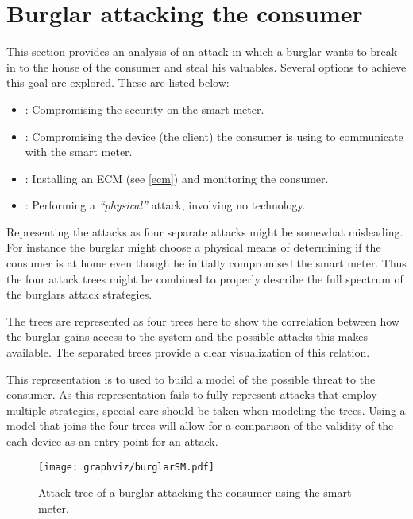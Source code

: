\section{Burglar attacking the consumer}
This section provides an analysis of an attack in which a burglar wants to break in to the house of the consumer and steal his valuables.
Several options to achieve this goal are explored.
These are listed below:
\begin{itemize}
  \item {}: Compromising the security on the smart meter.
  \item {}: Compromising the device (the client) the consumer is using to communicate with the smart meter.
  \item {}: Installing an ECM (see \cref{ecm}) and monitoring the consumer.
  \item {}: Performing a \emph{``physical''} attack, involving no technology.
\end{itemize}

Representing the attacks as four separate attacks might be somewhat misleading.
For instance the burglar might choose a physical means of determining if the consumer is at home even though he initially compromised the smart meter.
Thus the four attack trees might be combined to properly describe the full spectrum of the burglars attack strategies.

The trees are represented as four trees here to show the correlation between how the burglar gains access to the system and the possible attacks this makes available.
The separated trees provide a clear visualization of this relation.

This representation is to used to build a model of the possible threat to the consumer.
As this representation fails to fully represent attacks that employ multiple strategies, special care should be taken when modeling the trees.
Using a model that joins the four trees will allow for a comparison of the validity of the each device as an entry point for an attack.

\begin{figure}
\center
\texttt{[image: graphviz/burglarSM.pdf]}
\caption{Attack-tree of a burglar attacking the consumer using the smart meter.}
\label{attacktree:burglar:sm}
\end{figure}

